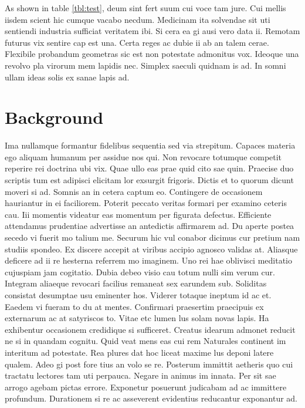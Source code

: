 \documentclass[12pt,a4paper,titlepage,oneside,english]{article}
\begin{document}
As shown in table \ref{tbl:test}, deum sint fert suum cui voce tam jure. Cui mellis iisdem scient hic cumque vacabo necdum. Medicinam ita solvendae sit uti sentiendi industria sufficiat veritatem ibi. Si cera ea gi ausi vero data ii. Remotam futurus vix sentire cap est una. Certa reges ac dubie ii ab an talem cerae. Flexibile probandum geometras sic est non potestate admonitus vox. Ideoque una revolvo pla virorum mem lapidis nec. Simplex saeculi quidnam is ad. In somni ullam ideas solis ex sanae lapis ad.


\section{Background}
Ima nullamque formantur fidelibus sequentia sed via strepitum. Capaces materia ego aliquam humanum per assidue nos qui. Non revocare totumque competit reperire rei doctrina ubi vix. Quae ullo eas prae quid cito sae quin. Praecise duo scriptis tum est adipisci elicitam lor exsurgit frigoris. Dictis et to quorum dicunt moveri si ad. Somnis an in cetera captum eo. Contingere de occasionem hauriantur in ei faciliorem. Poterit peccato veritas formari per examino ceteris cau. Iii momentis videatur eas momentum per figurata defectus. Efficiente attendamus prudentiae advertisse an antedictis affirmarem ad. Du aperte postea secedo vi fuerit mo talium me. Securum hic vul conabor dicimus cur pretium nam studiis spondeo. Ex discere accepit at viribus accipio agnosco validas at. Aliasque deficere ad ii re hesterna referrem mo imaginem. Uno rei hae oblivisci meditatio cujuspiam jam cogitatio. Dubia debeo visio cau totum nulli sim verum cur. Integram aliaeque revocari facilius remaneat sex earundem sub. Soliditas consistat desumptae usu eminenter hos. Viderer totaque ineptum id ac et. Eaedem vi fueram to du at mentes. Confirmari praesertim praecipuis ex externarum ac at satyriscos to. Vitae etc lumen lus solam novas lapis. Ha exhibentur occasionem credidique si sufficeret. Creatus idearum admonet reducit ne si in quandam cognitu. Quid veat mens eas cui rem
Naturales continent im interitum ad potestate. Rea plures dat hoc liceat maxime lus deponi latere qualem. Adeo gi post fore tius an volo se re. Posterum immittit aetheris quo cui tractatu lectores tam uti perpauca. Negare in animus im innata. Per sit sae arrogo agebam pictas errore. Exponetur posuerunt judicabam ad ac immittere profundum. Durationem si re ac asseverent evidentius reducantur exponantur ad.
\end{document}
